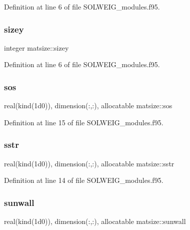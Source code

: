 Definition at line 6 of file S\+O\+L\+W\+E\+I\+G\+\_\+modules.\+f95.

\mbox{\label{namespacematsize_a2e4c4ca15fba50043654eaca59568a8f}} 
\subsubsection{\texorpdfstring{sizey}{sizey}}
{\footnotesize\ttfamily integer matsize\+::sizey}



Definition at line 6 of file S\+O\+L\+W\+E\+I\+G\+\_\+modules.\+f95.

\mbox{\label{namespacematsize_a1449eeb1e7360b8c66d2b3d039acf99b}} 
\subsubsection{\texorpdfstring{sos}{sos}}
{\footnotesize\ttfamily real(kind(1d0)), dimension(\+:,\+:), allocatable matsize\+::sos}



Definition at line 15 of file S\+O\+L\+W\+E\+I\+G\+\_\+modules.\+f95.

\mbox{\label{namespacematsize_acd84773bbc050ab317186fe55d403afe}} 
\subsubsection{\texorpdfstring{sstr}{sstr}}
{\footnotesize\ttfamily real(kind(1d0)), dimension(\+:,\+:), allocatable matsize\+::sstr}



Definition at line 14 of file S\+O\+L\+W\+E\+I\+G\+\_\+modules.\+f95.

\mbox{\label{namespacematsize_acb0719b5e8d656e7faaac0470f8b9008}} 
\subsubsection{\texorpdfstring{sunwall}{sunwall}}
{\footnotesize\ttfamily real(kind(1d0)), dimension(\+:,\+:), allocatable matsize\+::sunwall}



